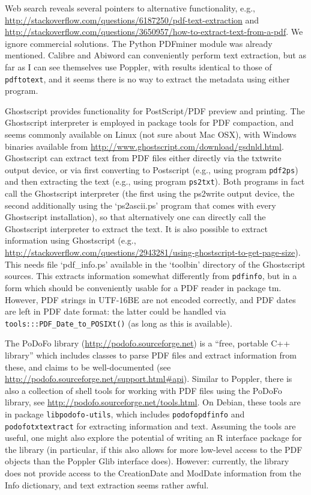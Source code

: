 \documentclass[a4paper]{article}
\newcommand{\file}[1]{`\textsf{#1}'}
\newcommand{\strong}[1]{{\normalfont\fontseries{b}\selectfont #1}}
\let\pkg=\strong
\begin{document}
Web search reveals several pointers to alternative functionality, e.g.,
\url{http://stackoverflow.com/questions/6187250/pdf-text-extraction} and 
\url{http://stackoverflow.com/questions/3650957/how-to-extract-text-from-a-pdf}.
We ignore commercial solutions.  The Python PDFminer module was already
mentioned.  Calibre and Abiword can conveniently perform text
extraction, but as far as I can see themselves use Poppler, with results
identical to those of \verb|pdftotext|, and it seems there is no way to
extract the metadata using either program.

Ghostscript provides functionality for PostScript/PDF preview and
printing.  The Ghostscript interpreter is employed in package
\pkg{tools} for PDF compaction, and seems commonly available on Linux
(not sure about Mac OSX), with Windows binaries available from
\url{http://www.ghostscript.com/download/gsdnld.html}.  Ghostscript can
extract text from PDF files either directly via the txtwrite output
device, or via first converting to Postscript (e.g., using program
\verb|pdf2ps|) and then extracting the text (e.g., using program
\verb|ps2txt|).  Both programs in fact call the Ghostscript interpreter
(the first using the ps2write output device, the second additionally
using the \file{ps2ascii.ps} program that comes with every Ghostscript
installation), so that alternatively one can directly call the
Ghostscript interpreter to extract the text.  It is also possible to
extract information using Ghostscript (e.g.,
\url{http://stackoverflow.com/questions/2943281/using-ghostscript-to-get-page-size}).
This needs file \file{pdf\_info.ps} available in the \file{toolbin}
directory of the Ghostscript sources.  This extracts information
somewhat differently from \verb|pdfinfo|, but in a form which should be
conveniently usable for a PDF reader in package \pkg{tm}.  However, PDF
strings in UTF-16BE are not encoded correctly, and PDF dates are left in
PDF date format: the latter could be handled via
\verb|tools:::PDF_Date_to_POSIXt()| (as long as this is available).

The PoDoFo library (\url{http://podofo.sourceforge.net}) is a ``free,
portable C++ library'' which includes classes to parse PDF files and
extract information from these, and claims to be well-documented (see
\url{http://podofo.sourceforge.net/support.html#api}).  Similar to
Poppler, there is also a collection of shell tools for working with PDF
files using the PoDoFo library, see
\url{http://podofo.sourceforge.net/tools.html}.  On Debian, these tools
are in package \verb|libpodofo-utils|, which includes
\verb|podofopdfinfo| and \verb|podofotxtextract| for extracting
information and text.  Assuming the tools are useful, one might also
explore the potential of writing an R interface package for the library
(in particular, if this also allows for more low-level access to the PDF
objects than the Poppler Glib interface does).  However: currently,
the library does not provide access to the CreationDate and ModDate
information from the Info dictionary, and text extraction seems rather
awful.
\end{document}
